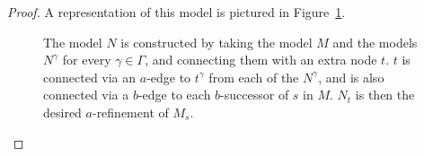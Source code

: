 \begin{proof}
A representation of this model is pictured in Figure~\ref{k-diagram}.

\begin{figure}
\begin{center}
\caption{\label{k-diagram}
The model $N$ is constructed by taking the model $M$ and the models $N^\gamma$
for every $\gamma \in \Gamma$, and connecting them with an extra node $t$. $t$
is connected via an $a$-edge to $t^\gamma$ from each of the $N^\gamma$, and is
also connected via a $b$-edge to each $b$-successor of $s$ in $M$. $N_t$ is
then the desired $a$-refinement of $M_s$.
}
\end{center}
\end{figure}


\end{proof}
